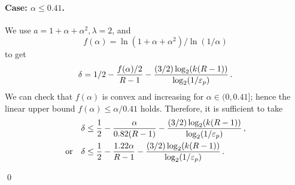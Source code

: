 	\paragraph{Case: $\alpha \leq 0.41$.} 
	We use $a = 1 + \alpha + \alpha^2, \lambda = 2$, and 
	$$ 
		f(\alpha) = \ln(1 + \alpha + \alpha^2)/\ln(1/\alpha)
	$$
	to get 
	$$
	\delta = 
		1/2 
			- \frac{f(\alpha)/2}{R - 1} 
			- \frac{(3/2) \log_2(k(R-1))}{\log_2(1/\mathsf{\varepsilon}_p)}
			\,.
	$$
	{\color{blue}We can check that }
	$f(\alpha)$ is convex and increasing for $\alpha \in (0, 0.41]$; 
	hence the linear upper bound 
	$f(\alpha) \leq \alpha/0.41$ holds. 
	Therefore, it is sufficient to take 
	\begin{align*}
		&\delta 
			\leq 
			\frac{1}{2} 
				- \frac{\alpha}{0.82 (R - 1)} 
				- \frac{(3/2) \log_2(k(R-1))}{\log_2(1/\mathsf{\varepsilon}_p)} 
				\,, \\
		\text{or}\quad&\delta \leq \frac{1}{2} 
				- \frac{1.22 \alpha}{R - 1} 
				- \frac{(3/2)\log_2(k(R-1))}{\log_2(1/\mathsf{\varepsilon}_p)} 
				\,.		
	\end{align*}

	\hfill\qed






